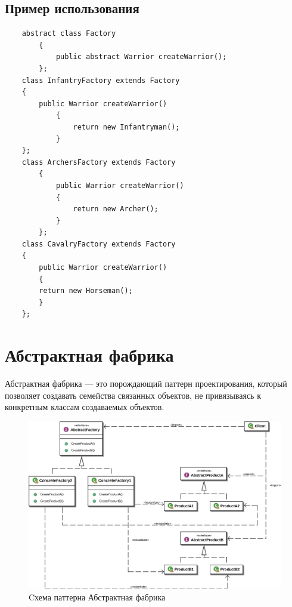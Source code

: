 \subsection{Пример использования}
\begin{lstlisting}
    abstract class Factory
        {
            public abstract Warrior createWarrior();
        };
    class InfantryFactory extends Factory
    {
        public Warrior createWarrior()
            {
                return new Infantryman();
            }
    };
    class ArchersFactory extends Factory
        {
            public Warrior createWarrior()
            {
                return new Archer();
            }
        };
    class CavalryFactory extends Factory
    {
        public Warrior createWarrior()
        {
        return new Horseman();
        }
    };
\end{lstlisting}
\section{Абстрактная фабрика}
Абстрактная фабрика — это порождающий паттерн проектирования, который позволяет создавать семейства связанных объектов, не привязываясь к конкретным классам создаваемых объектов.
\newpage
\begin{figure}[!ht]
\begin{center}
\includegraphics[scale=0.3]{images/pic/pic26-3.png}\caption{Cхема паттерна Абстрактная фабрика}\label{figure1}
\end{center}
\end{figure}

